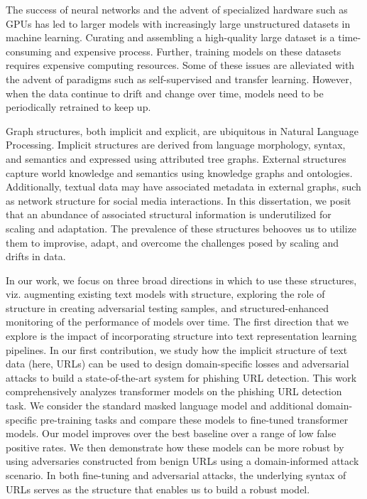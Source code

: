 The success of neural networks and the advent of specialized hardware such as GPUs has led to larger models with increasingly large unstructured datasets in machine learning.
Curating and assembling a high-quality large dataset is a time-consuming and expensive process.
Further, training models on these datasets requires expensive computing resources.
Some of these issues are alleviated with the advent of paradigms such as self-supervised and transfer learning.
However, when the data continue to drift and change over time,
models need to be periodically retrained to keep up.

Graph structures, both implicit and explicit, are ubiquitous in Natural Language Processing.
Implicit structures are derived from language morphology, syntax, and semantics and expressed using attributed tree graphs.
External structures capture world knowledge and semantics using knowledge graphs and ontologies.
Additionally, textual data may have associated metadata in external graphs, such as network structure for social media interactions.
In this dissertation, we posit that an abundance of associated structural information is underutilized for scaling and adaptation.
The prevalence of these structures behooves us to utilize them to improvise, adapt, and overcome the challenges posed by scaling and drifts in data.

In our work, we focus on three broad directions in which to use these structures, viz. augmenting existing text models with structure, exploring the role of structure in creating adversarial testing samples, and structured-enhanced monitoring of the performance of models over time.
The first direction that we explore is the impact of incorporating structure into text representation learning pipelines.
In our first contribution, we study how the implicit structure of text data (here, URLs) can be used to design domain-specific losses and adversarial attacks to build a state-of-the-art system for phishing URL detection.
This work comprehensively analyzes transformer models on the phishing URL detection task.
We consider the standard masked language model and additional domain-specific pre-training tasks and compare these models to fine-tuned transformer models.
Our model improves over the best baseline over a range of low false positive rates.
We then demonstrate how these models can be more robust by using adversaries constructed from benign URLs using a domain-informed attack scenario. 
In both fine-tuning and adversarial attacks, the underlying syntax of URLs serves as the structure that enables us to build a robust model.

